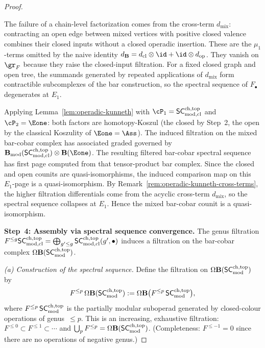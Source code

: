 \begin{proof}
\begin{remark}
\label{rem:operadic-kunneth-cross-terms}
The failure of a chain-level factorization comes from the
cross-term $d_{\mathrm{mix}}$: contracting an open edge between
mixed vertices with positive closed valence combines their closed
inputs without a closed operadic insertion. These are the
$\mu_1$-terms omitted by the naive identity
$d_{\mathbf{B}} = d_{\mathrm{cl}} \otimes \id
+ \id \otimes d_{\mathrm{op}}$.
They vanish on $\gr_F$ because they raise the closed-input
filtration. For a fixed closed graph and open tree, the summands
generated by repeated applications of $d_{\mathrm{mix}}$ form
contractible subcomplexes of the bar construction, so the
spectral sequence of $F_\bullet$ degenerates at $E_1$.
\end{remark}

Applying Lemma~\ref{lem:operadic-kunneth} with
$\cP_1 = \SCmodcl$ and $\cP_2 = \Eone$:
both factors are homotopy-Koszul (the closed by
Step~2, the open by the classical Koszulity of $\Eone = \Ass$).
The induced filtration on the mixed bar-cobar complex has
associated graded governed by
$\mathbf{B}_{\mathrm{mod}}(\SCmodcl) \otimes \mathbf{B}(\Eone)$.
The resulting filtered bar-cobar spectral sequence has first page
computed from that tensor-product bar complex. Since the closed
and open counits are quasi-isomorphisms, the induced comparison
map on this $E_1$-page is a quasi-isomorphism. By
Remark~\ref{rem:operadic-kunneth-cross-terms}, the higher
filtration differentials come from the acyclic cross-term
$d_{\mathrm{mix}}$, so the spectral sequence collapses at $E_1$.
Hence the mixed bar-cobar counit is a quasi-isomorphism.

\medskip\noindent
\textbf{Step~4: Assembly via spectral sequence convergence.}
The genus filtration $F^{\le g} \mathsf{SC}^{\mathrm{ch,top}}_{\mathrm{mod,cl}}
= \bigoplus_{g' \le g} \mathsf{SC}^{\mathrm{ch,top}}_{\mathrm{mod,cl}}(g', \bullet)$
induces a filtration on the bar-cobar complex
$\Omega\mathbf{B}(\mathsf{SC}^{\mathrm{ch,top}}_{\mathrm{mod}})$.

\medskip
\emph{(a) Construction of the spectral sequence.}
Define the filtration on $\Omega\mathbf{B}(\mathsf{SC}^{\mathrm{ch,top}}_{\mathrm{mod}})$ by
\[
 F^{\le p}\, \Omega\mathbf{B}(\mathsf{SC}^{\mathrm{ch,top}}_{\mathrm{mod}})
 := \Omega\mathbf{B}\bigl(F^{\le p}\, \mathsf{SC}^{\mathrm{ch,top}}_{\mathrm{mod}}\bigr),
\]
where $F^{\le p}\, \mathsf{SC}^{\mathrm{ch,top}}_{\mathrm{mod}}$ is the partially modular suboperad
generated by closed-colour operations of genus~$\le p$.
This is an increasing, exhaustive filtration:
$F^{\le 0} \subset F^{\le 1} \subset \cdots$ and
$\bigcup_p F^{\le p} = \Omega\mathbf{B}(\mathsf{SC}^{\mathrm{ch,top}}_{\mathrm{mod}})$.
(Completeness: $F^{\le -1} = 0$ since there are no operations
of negative genus.)


\end{proof}
